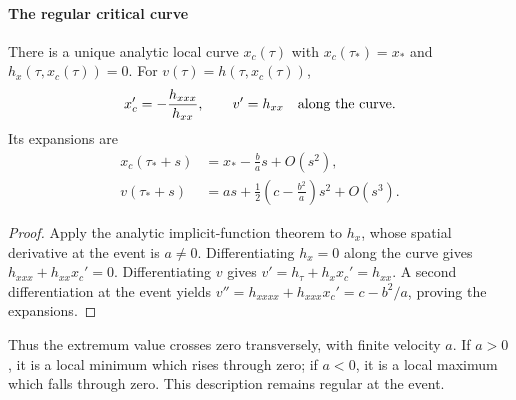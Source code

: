 \paragraph{The regular critical curve}
\begin{proposition}\label{prop:critical}
There is a unique analytic local curve \(x_c(\tau)\) with
\(x_c(\tau_*)=x_*\) and \(h_x(\tau,x_c(\tau))=0\).
For \(v(\tau)=h(\tau,x_c(\tau))\),
\begin{equation}\label{eq:critical-exact}
 x_c'=-\frac{h_{xxx}}{h_{xx}},\qquad v'=h_{xx}
 \quad\hbox{along the curve}.
\end{equation}
Its expansions are
\begin{align}
 x_c(\tau_*+s)&=x_*-\frac ba s+O(s^2),\label{eq:critical-place}\\
 v(\tau_*+s)&=as+\frac12\left(c-\frac{b^2}{a}\right)s^2+O(s^3).
 \label{eq:critical-value}
\end{align}
\end{proposition}
\begin{proof}
Apply the analytic implicit-function theorem to \(h_x\), whose spatial
derivative at the event is \(a\ne0\). Differentiating \(h_x=0\) along
the curve gives \(h_{xxx}+h_{xx}x_c'=0\). Differentiating \(v\) gives
\(v'=h_\tau+h_xx_c'=h_{xx}\). A second differentiation at the event
yields \(v''=h_{xxxx}+h_{xxx}x_c'=c-b^2/a\), proving the expansions.
\end{proof}

Thus the extremum value crosses zero transversely, with finite velocity
\(a\). If \(a>0\), it is a local minimum which rises through zero; if
\(a<0\), it is a local maximum which falls through zero. This description
remains regular at the event.

